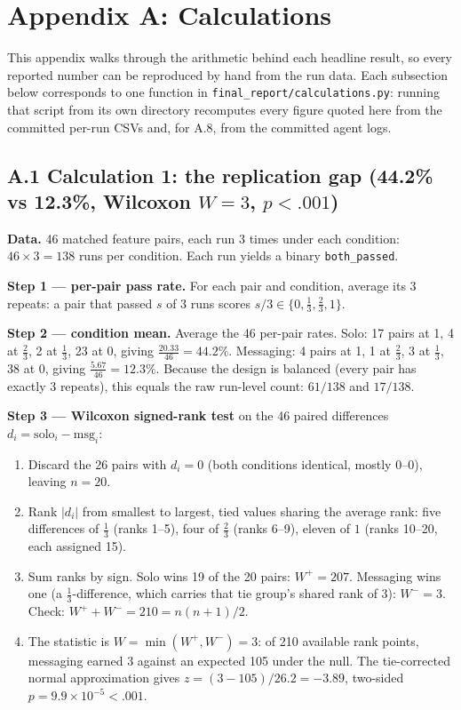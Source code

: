 \documentclass[11pt,a4paper]{article}
\begin{document}
\newpage
%
%
\appendix
\section*{Appendix A: Calculations}

This appendix walks through the arithmetic behind each headline result, so every reported number can be reproduced by hand from the run data. Each subsection below corresponds to one function in \texttt{final\_report/calculations.py}: running that script from its own directory recomputes every figure quoted here from the committed per-run CSVs and, for A.8, from the committed agent logs.

\subsection*{A.1 \quad Calculation 1: the replication gap (44.2\% vs 12.3\%, Wilcoxon $W = 3$, $p < .001$)}

\textbf{Data.} 46 matched feature pairs, each run 3 times under each condition: $46 \times 3 = 138$ runs per condition. Each run yields a binary \texttt{both\_passed}.

\textbf{Step 1 --- per-pair pass rate.} For each pair and condition, average its 3 repeats: a pair that passed $s$ of 3 runs scores $s/3 \in \{0, \tfrac{1}{3}, \tfrac{2}{3}, 1\}$.

\textbf{Step 2 --- condition mean.} Average the 46 per-pair rates. Solo: 17 pairs at 1, 4 at $\tfrac{2}{3}$, 2 at $\tfrac{1}{3}$, 23 at 0, giving $\tfrac{20.33}{46} = 44.2\%$. Messaging: 4 pairs at 1, 1 at $\tfrac{2}{3}$, 3 at $\tfrac{1}{3}$, 38 at 0, giving $\tfrac{5.67}{46} = 12.3\%$. Because the design is balanced (every pair has exactly 3 repeats), this equals the raw run-level count: $61/138$ and $17/138$.

\textbf{Step 3 --- Wilcoxon signed-rank test} on the 46 paired differences $d_i = \text{solo}_i - \text{msg}_i$:
\begin{enumerate}
    \item Discard the 26 pairs with $d_i = 0$ (both conditions identical, mostly $0$--$0$), leaving $n = 20$.
    \item Rank $|d_i|$ from smallest to largest, tied values sharing the average rank: five differences of $\tfrac{1}{3}$ (ranks 1--5), four of $\tfrac{2}{3}$ (ranks 6--9), eleven of $1$ (ranks 10--20, each assigned 15).
    \item Sum ranks by sign. Solo wins 19 of the 20 pairs: $W^{+} = 207$. Messaging wins one (a $\tfrac{1}{3}$-difference, which carries that tie group's shared rank of 3): $W^{-} = 3$. Check: $W^{+} + W^{-} = 210 = n(n+1)/2$.
    \item The statistic is $W = \min(W^{+}, W^{-}) = 3$: of 210 available rank points, messaging earned 3 against an expected 105 under the null. The tie-corrected normal approximation gives $z = (3 - 105)/26.2 = -3.89$, two-sided $p = 9.9 \times 10^{-5} < .001$.
\end{enumerate}
\end{document}
